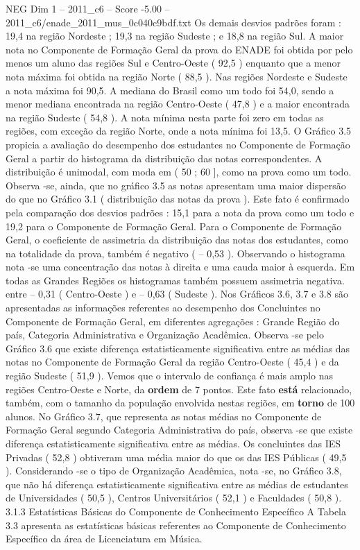 \begin{textsample}{NEG Dim 1 – 2011\_c6 – Score -5.00 – 2011\_c6/enade\_2011\_mus\_0c040c9bdf.txt}
Os demais desvios padrões foram : 19,4 na região Nordeste ; 19,3 na região Sudeste ; e 18,8 na região Sul.
A maior nota no Componente de Formação Geral da prova do ENADE foi obtida por pelo menos um aluno das regiões Sul e Centro-Oeste ( 92,5 ) enquanto que a menor nota máxima foi obtida na região Norte ( 88,5 ).
Nas regiões Nordeste e Sudeste a nota máxima foi 90,5.
A mediana do Brasil como um todo foi 54,0, sendo a menor mediana encontrada na região Centro-Oeste ( 47,8 ) e a maior encontrada na região Sudeste ( 54,8 ).
A nota mínima nesta parte foi zero em todas as regiões, com exceção da região Norte, onde a nota mínima foi 13,5.
O Gráfico 3.5 propicia a avaliação do desempenho dos estudantes no Componente de Formação Geral a partir do histograma da distribuição das notas correspondentes.
A distribuição é unimodal, com moda em ( 50 ; 60 ], como na prova como um todo.
Observa -se, ainda, que no gráfico 3.5 as notas apresentam uma maior dispersão do que no Gráfico 3.1 ( distribuição das notas da prova ).
Este fato é confirmado pela comparação dos desvios padrões : 15,1 para a nota da prova como um todo e 19,2 para o Componente de Formação Geral.
Para o Componente de Formação Geral, o coeficiente de assimetria da distribuição das notas dos estudantes, como na totalidade da prova, também é negativo ( – 0,53 ).
Observando o histograma nota -se uma concentração das notas à direita e uma cauda maior à esquerda.
Em todas as Grandes Regiões os histogramas também possuem assimetria negativa. entre – 0,31 ( Centro-Oeste ) e – 0,63 ( Sudeste ).
Nos Gráficos 3.6, 3.7 e 3.8 são apresentadas as informações referentes ao desempenho dos Concluintes no Componente de Formação Geral, em diferentes agregações : Grande Região do país, Categoria Administrativa e Organização Acadêmica.
Observa -se pelo Gráfico 3.6 que existe diferença estatisticamente significativa entre as médias das notas no Componente de Formação Geral da região Centro-Oeste ( 45,4 ) e da região Sudeste ( 51,9 ).
Vemos que o intervalo de confiança é mais amplo nas regiões Centro-Oeste e Norte, da \textbf{ordem} de 7 pontos.
Este fato \textbf{está} relacionado, também, com o tamanho da população envolvida nestas regiões, em \textbf{torno} de 100 alunos.
No Gráfico 3.7, que representa as notas médias no Componente de Formação Geral segundo Categoria Administrativa do país, observa -se que existe diferença estatisticamente significativa entre as médias.
Os concluintes das IES Privadas ( 52,8 ) obtiveram uma média maior do que os das IES Públicas ( 49,5 ).
Considerando -se o tipo de Organização Acadêmica, nota -se, no Gráfico 3.8, que não há diferença estatisticamente significativa entre as médias de estudantes de Universidades ( 50,5 ), Centros Universitários ( 52,1 ) e Faculdades ( 50,8 ). 3.1.3 Estatísticas Básicas do Componente de Conhecimento Específico A Tabela 3.3 apresenta as estatísticas básicas referentes ao Componente de Conhecimento Específico da área de Licenciatura em Música.

\end{textsample}
